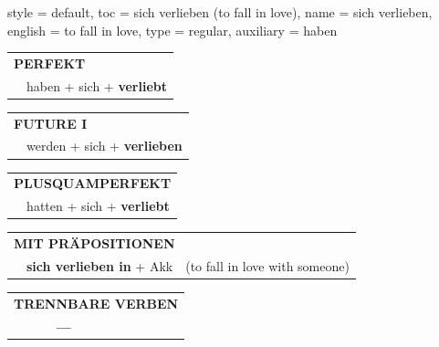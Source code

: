 \begin{verbentry}{
  style = {default},
  toc = {sich verlieben (to fall in love)},
  name = {sich verlieben},
  english = {to fall in love},
  type = {regular},
  auxiliary = {haben}
}
 \begin{tabular}{rl}
     \multicolumn{2}{l}{\textbf{PERFEKT}}\\
    &haben + sich + \textbf{verliebt}\\
  \end{tabular}
\hfill
   \begin{tabular}{rl}
   
    \multicolumn{2}{l}{\textbf{FUTURE I} }\\
    &werden + sich + \textbf{verlieben}\\
 
  \end{tabular}
\hfill
   \begin{tabular}{rl}
      \multicolumn{2}{l}{\textbf{PLUSQUAMPERFEKT}}\\
    &hatten + sich + \textbf{verliebt}\\
  \end{tabular}
  
\vspace{10pt}

   \begin{tabular}{lll}
      \multicolumn{3}{l}{\textbf{MIT PRÄPOSITIONEN}}\\
& \textbf{sich verlieben in} + Akk & (to fall in love with someone)
  \end{tabular}
  \hfill
   \begin{tabular}{lll}
\multicolumn{3}{l}{\textbf{TRENNBARE VERBEN}}\\
& \textbf{---} & \\
\end{tabular}
  
  \vspace{-5pt}
\end{verbentry}

